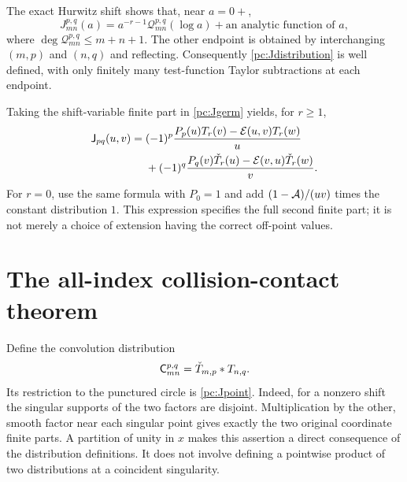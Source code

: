 The exact Hurwitz shift shows that, near $a=0+$,
\[
 J_{mn}^{p,q}(a)=a^{-r-1}\mathcal Q_{mn}^{p,q}(\log a)
                         +\text{an analytic function of }a,
\]
where $\deg\mathcal Q_{mn}^{p,q}\le m+n+1$. The other endpoint is obtained by interchanging $(m,p)$ and $(n,q)$ and reflecting. Consequently \eqref{pc:Jdistribution} is well defined, with only finitely many test-function Taylor subtractions at each endpoint.

Taking the shift-variable finite part in \eqref{pc:Jgerm} yields, for $r\ge1$,
\begin{align}\label{pc:Jfpgen}
 \mathsf J_{pq}(u,v)
 ={}&(-1)^p\frac{P_p(u)T_r(v)-\mathcal E(u,v)T_r(w)}u\notag\\
 &+(-1)^q\frac{P_q(v)\check T_r(u)-\mathcal E(v,u)\check T_r(w)}v.
\end{align}
For $r=0$, use the same formula with $P_0=1$ and add $(1-\mathcal A)/(uv)$ times the constant distribution $1$. This expression specifies the full second finite part; it is not merely a choice of extension having the correct off-point values.

\section{The all-index collision-contact theorem}\label{pc:mainsection}
Define the convolution distribution
\begin{equation}\label{pc:Cdef}
 \mathsf C_{mn}^{p,q}=\check T_{m,p}*T_{n,q}.
\end{equation}
Its restriction to the punctured circle is \eqref{pc:Jpoint}. Indeed, for a nonzero shift the singular supports of the two factors are disjoint. Multiplication by the other, smooth factor near each singular point gives exactly the two original coordinate finite parts. A partition of unity in $x$ makes this assertion a direct consequence of the distribution definitions. It does not involve defining a pointwise product of two distributions at a coincident singularity.

